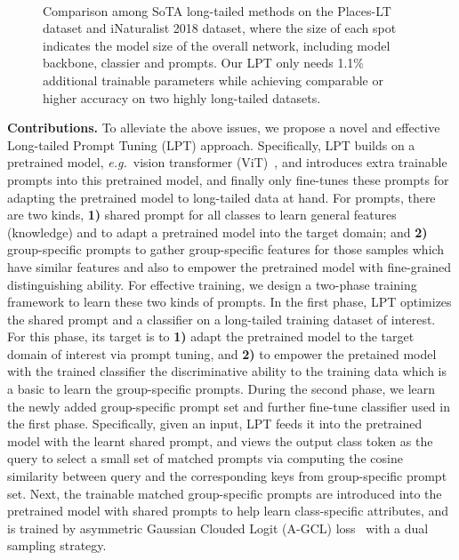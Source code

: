 \documentclass{article} \usepackage{iclr2023_conference,times}
\newcommand{\eg}{\emph{e.g.}}
\begin{document}
\begin{figure}[tb]
\vspace{-1em}
	\centering
	  \\
	\vspace{-1.1em}
	\caption{Comparison among  SoTA long-tailed  methods on the Places-LT dataset and iNaturalist 2018 dataset, where the size of each spot indicates the model size of the overall network, including model backbone, classier and prompts. Our LPT only needs 1.1\% additional trainable parameters while achieving comparable or higher  accuracy on two highly  long-tailed datasets. }
   \label{fig:param_acc_comp}
	\vspace{-1.4em}
\end{figure}



\textbf{Contributions.} To  alleviate the above issues, we propose a novel and effective Long-tailed Prompt Tuning (LPT) approach.  Specifically, LPT builds on a pretrained model, \eg~vision transformer (ViT)~\citep{dosovitskiy2021an}, and introduces extra trainable  prompts into this pretrained model, and finally only fine-tunes these prompts  for adapting the pretrained model to long-tailed data at hand.  For prompts, there are two kinds, \textbf{1)} shared prompt for all classes to learn  general features (knowledge) and to adapt a pretrained model into the target domain; and \textbf{2)} group-specific prompts to  gather group-specific features for those samples which have similar features and also to empower the pretrained model with fine-grained distinguishing ability. For effective training, we design a two-phase training framework to learn these two kinds of prompts. In the first phase, LPT optimizes the shared prompt and a classifier on a long-tailed training dataset of interest. For this phase, its target is to \textbf{1)} adapt the pretrained model to the target domain of  interest via prompt tuning, and \textbf{2)} to empower the pretained model with the trained classifier the discriminative ability to the training data which is a basic to learn the group-specific prompts.  During the second phase, we learn the newly added group-specific prompt set and further fine-tune classifier used in the first phase.  Specifically, given an input, LPT feeds it into the pretrained model with  the learnt  shared prompt, and views  the output class token as the query to select  a small set of matched prompts via computing the cosine similarity  between query and the corresponding keys from group-specific prompt set. Next, the trainable matched group-specific prompts 
 are introduced into the pretrained model with shared prompts to help learn class-specific attributes, and is trained by asymmetric Gaussian Clouded Logit (A-GCL) loss~\citep{Li2022Long} with a dual sampling strategy.
\end{document}
